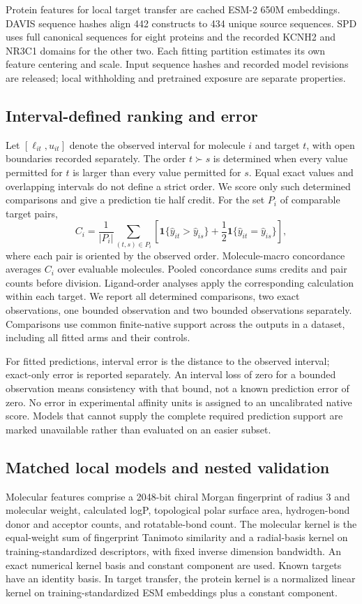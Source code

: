 \documentclass[pdflatex, sn-nature]{sn-jnl}
\begin{document}
Protein features for local target transfer are cached ESM-2 650M embeddings. DAVIS sequence hashes align 442 constructs to 434 unique source sequences. SPD uses full canonical sequences for eight proteins and the recorded KCNH2 and NR3C1 domains for the other two. Each fitting partition estimates its own feature centering and scale. Input sequence hashes and recorded model revisions are released; local withholding and pretrained exposure are separate properties.

\subsection{Interval-defined ranking and error}
Let $[\ell_{it}, u_{it}]$ denote the observed interval for molecule $i$ and target $t$, with open boundaries recorded separately. The order $t\succ s$ is determined when every value permitted for $t$ is larger than every value permitted for $s$. Equal exact values and overlapping intervals do not define a strict order. We score only such determined comparisons and give a prediction tie half credit. For the set $P_i$ of comparable target pairs,
\begin{equation}
 C_i=\frac{1}{|P_i|}\sum_{(t, s)\in P_i}\left[\mathbf{1}\{\widehat y_{it}>\widehat y_{is}\}+\frac{1}{2}\mathbf{1}\{\widehat y_{it}=\widehat y_{is}\}\right],
\end{equation}
where each pair is oriented by the observed order. Molecule-macro concordance averages $C_i$ over evaluable molecules. Pooled concordance sums credits and pair counts before division. Ligand-order analyses apply the corresponding calculation within each target. We report all determined comparisons, two exact observations, one bounded observation and two bounded observations separately. Comparisons use common finite-native support across the outputs in a dataset, including all fitted arms and their controls.

For fitted predictions, interval error is the distance to the observed interval; exact-only error is reported separately. An interval loss of zero for a bounded observation means consistency with that bound, not a known prediction error of zero. No error in experimental affinity units is assigned to an uncalibrated native score. Models that cannot supply the complete required prediction support are marked unavailable rather than evaluated on an easier subset.

\subsection{Matched local models and nested validation}
Molecular features comprise a 2048-bit chiral Morgan fingerprint of radius 3 and molecular weight, calculated logP, topological polar surface area, hydrogen-bond donor and acceptor counts, and rotatable-bond count. The molecular kernel is the equal-weight sum of fingerprint Tanimoto similarity and a radial-basis kernel on training-standardized descriptors, with fixed inverse dimension bandwidth. An exact numerical kernel basis and constant component are used. Known targets have an identity basis. In target transfer, the protein kernel is a normalized linear kernel on training-standardized ESM embeddings plus a constant component.
\end{document}
